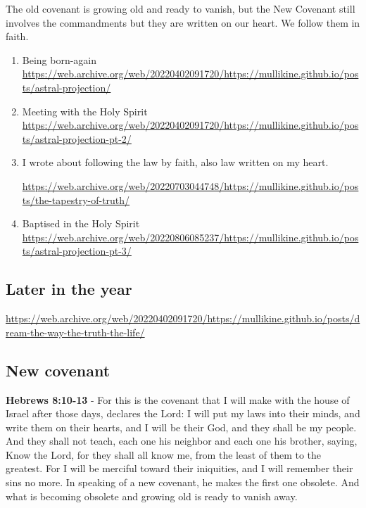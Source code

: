 \documentclass[11pt]{article}
\begin{document}
The old covenant is growing old and ready to vanish, but the New Covenant still involves the commandments but they are written on our heart.
We follow them in faith.

\begin{enumerate}
\item Being born-again
\label{sec:orge0f874a}
\url{https://web.archive.org/web/20220402091720/https://mullikine.github.io/posts/astral-projection/}

\item Meeting with the Holy Spirit
\label{sec:org1fb0364}
\url{https://web.archive.org/web/20220402091720/https://mullikine.github.io/posts/astral-projection-pt-2/}

\item I wrote about following the law by faith, also law written on my heart.
\label{sec:org525f11c}

\url{https://web.archive.org/web/20220703044748/https://mullikine.github.io/posts/the-tapestry-of-truth/}

\item Baptised in the Holy Spirit
\label{sec:org378f376}
\url{https://web.archive.org/web/20220806085237/https://mullikine.github.io/posts/astral-projection-pt-3/}
\end{enumerate}

\subsection{Later in the year}
\label{sec:org89c7eae}
\url{https://web.archive.org/web/20220402091720/https://mullikine.github.io/posts/dream-the-way-the-truth-the-life/}

\subsection{New covenant}
\label{sec:orge677296}
\textbf{Hebrews 8:10-13} - For this is the covenant that I will make with the house of Israel after those days, declares the Lord: I will put my laws into their minds, and write them on their hearts, and I will be their God, and they shall be my people.  And they shall not teach, each one his neighbor and each one his brother, saying, Know the Lord, for they shall all know me, from the least of them to the greatest.  For I will be merciful toward their iniquities, and I will remember their sins no more.  In speaking of a new covenant, he makes the first one obsolete. And what is becoming obsolete and growing old is ready to vanish away.
\end{document}
